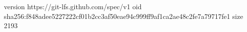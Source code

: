 version https://git-lfs.github.com/spec/v1
oid sha256:f848adee5227222cf01b2cc3af50eae94c999ff9af1ca2ae48c2fe7a79717fe1
size 2193
